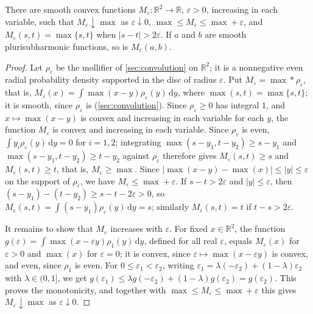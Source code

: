 \begin{lemma}\label{lem:smooth-maximum}
There are smooth convex functions $M_\varepsilon\colon\mathbb{R}^2\to\mathbb{R}$, $\varepsilon>0$, increasing in each variable, such that $M_\varepsilon\downarrow\max$ as $\varepsilon\downarrow0$, $\max\le M_\varepsilon\le\max+\varepsilon$, and $M_\varepsilon(s,t)=\max\{s,t\}$ when $|s-t|>2\varepsilon$. If $a$ and $b$ are smooth plurisubharmonic functions, so is $M_\varepsilon(a,b)$.
\end{lemma}
\begin{proof}
Let $\rho_\varepsilon$ be the mollifier of \cref{sec:convolution} on $\mathbb{R}^2$; it is a nonnegative even radial probability density supported in the disc of radius $\varepsilon$. Put $M_\varepsilon=\max*\rho_\varepsilon$, that is, $M_\varepsilon(x)=\int\max(x-y)\rho_\varepsilon(y)\,\mathrm dy$, where $\max(s,t)=\max\{s,t\}$; it is smooth, since $\rho_\varepsilon$ is (\cref{sec:convolution}). Since $\rho_\varepsilon\ge0$ has integral $1$, and $x\mapsto\max(x-y)$ is convex and increasing in each variable for each $y$, the function $M_\varepsilon$ is convex and increasing in each variable. Since $\rho_\varepsilon$ is even, $\int y_i\rho_\varepsilon(y)\,\mathrm dy=0$ for $i=1,2$; integrating $\max(s-y_1,t-y_2)\ge s-y_1$ and $\max(s-y_1,t-y_2)\ge t-y_2$ against $\rho_\varepsilon$ therefore gives $M_\varepsilon(s,t)\ge s$ and $M_\varepsilon(s,t)\ge t$, that is, $M_\varepsilon\ge\max$. Since $|\max(x-y)-\max(x)|\le|y|\le\varepsilon$ on the support of $\rho_\varepsilon$, we have $M_\varepsilon\le\max+\varepsilon$. If $s-t>2\varepsilon$ and $|y|\le\varepsilon$, then $(s-y_1)-(t-y_2)\ge s-t-2\varepsilon>0$, so $M_\varepsilon(s,t)=\int(s-y_1)\rho_\varepsilon(y)\,\mathrm dy=s$; similarly $M_\varepsilon(s,t)=t$ if $t-s>2\varepsilon$.

It remains to show that $M_\varepsilon$ increases with $\varepsilon$. For fixed $x\in\mathbb R^2$, the function $g(\varepsilon)=\int\max(x-\varepsilon y)\rho_1(y)\,\mathrm{d}y$, defined for all real $\varepsilon$, equals $M_\varepsilon(x)$ for $\varepsilon>0$ and $\max(x)$ for $\varepsilon=0$; it is convex, since $\varepsilon\mapsto\max(x-\varepsilon y)$ is convex, and even, since $\rho_1$ is even. For $0\le\varepsilon_1<\varepsilon_2$, writing $\varepsilon_1=\lambda(-\varepsilon_2)+(1-\lambda)\varepsilon_2$ with $\lambda\in(0,1]$, we get $g(\varepsilon_1)\le\lambda g(-\varepsilon_2)+(1-\lambda)g(\varepsilon_2)=g(\varepsilon_2)$. This proves the monotonicity, and together with $\max\le M_\varepsilon\le\max+\varepsilon$ this gives $M_\varepsilon\downarrow\max$ as $\varepsilon\downarrow0$.


\end{proof}
